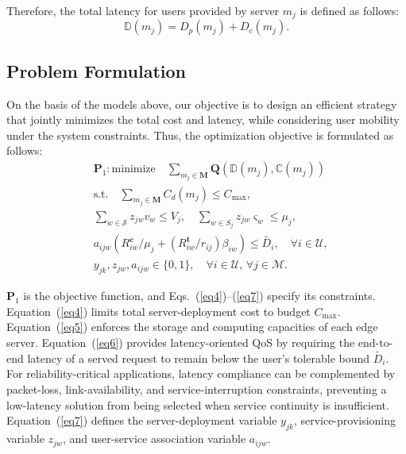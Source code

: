 \documentclass[10pt, conference, letterpaper]{IEEEtran}
\begin{document}
Therefore, the total latency for users provided by server $m_j$ is defined as follows: 
\begin{equation}
	\mathbb{D}(m_j) = D_{p}(m_j) + D_{c}(m_j).
	\label{eq2}
\end{equation}

\subsection{Problem Formulation}
On the basis of the models above, our objective is to design an efficient strategy that jointly minimizes the total cost and latency, while considering user mobility under the system constraints. Thus, the optimization objective is formulated as follows: 
\begin{align}
	&\textbf{P}_1:\text{minimize} \quad \sum_{m_j\in \textbf{M}}\textbf{Q}(\mathbb{D}(m_j), \mathbb{C}(m_j))\label{eq3}\\
&\text{s.t.} \quad \sum_{m_j\in \textbf{M}} C_{d}(m_j) \leq C_{\max},\label{eq4}\\
& \sum_{w \in \mathcal{S}} z_{jw}v_w \leq V_j, \quad \sum_{w \in S_j} z_{jw}\varsigma_w \leq \mu_j, \,\label{eq5} \\
& a_{ijw}\left({R^{\textbf{c}}_{iw}}/{\mu_j} + ({R^{\textbf{t}}_{iw}}/{r_{ij}})\beta_{iw}\right) \leq \widetilde{D_i}, \quad \forall i \in \mathcal{U}, \label{eq6} \\
& y_{jk}, z_{jw}, a_{ijw} \in \{0,1\}, \quad \forall i \in \mathcal{U}, \, \forall j \in \mathcal{M}.\label{eq7}
\end{align}  

$\textbf{P}_1$ is the objective function, and Eqs.~(\ref{eq4})--(\ref{eq7}) specify its constraints. Equation~(\ref{eq4}) limits total server-deployment cost to budget $C_{\max}$. Equation~(\ref{eq5}) enforces the storage and computing capacities of each edge server. Equation~(\ref{eq6}) provides latency-oriented QoS by requiring the end-to-end latency of a served request to remain below the user's tolerable bound $\widetilde{D_i}$. For reliability-critical applications, latency compliance can be complemented by packet-loss, link-availability, and service-interruption constraints, preventing a low-latency solution from being selected when service continuity is insufficient. Equation~(\ref{eq7}) defines the server-deployment variable $y_{jk}$, service-provisioning variable $z_{jw}$, and user-service association variable $a_{ijw}$.
\end{document}
